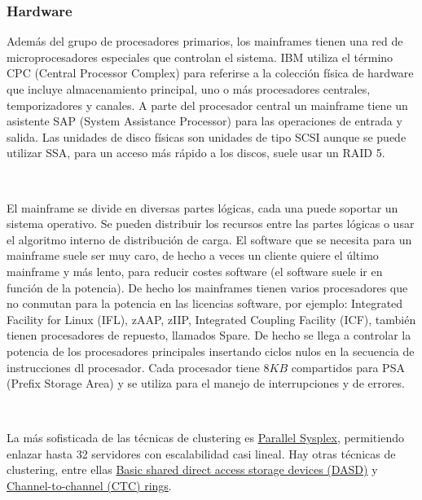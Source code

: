 \documentclass[paper=a4, fontsize=10pt]{scrartcl} %
\numberwithin{equation}{section} %
\numberwithin{figure}{section} %
\numberwithin{table}{section} %
\begin{document}
\subsubsection{Hardware}
Además del grupo de procesadores primarios, los mainframes tienen una red de microprocesadores especiales que controlan el sistema.
IBM utiliza el término CPC (Central Processor Complex) para referirse a la colección física de hardware que incluye almacenamiento principal, uno o más procesadores centrales, temporizadores y canales.
A parte del procesador central un mainframe tiene un asistente SAP (System Assistance Processor) para las operaciones de entrada y salida.
Las unidades de disco físicas son unidades de tipo SCSI aunque se puede utilizar SSA, para un acceso más rápido a los discos, suele usar un RAID 5.

\

El mainframe se divide en diversas partes lógicas, cada una puede soportar un sistema operativo.
Se pueden distribuir los recursos entre las partes lógicas o usar el algoritmo interno de distribución de carga.
El software que se necesita para un mainframe suele ser muy caro, de hecho a veces un cliente quiere el último mainframe y más lento, para reducir costes software (el software suele ir en función de la potencia).
De hecho los mainframes tienen varios procesadores que no conmutan para la potencia en las licencias software, por ejemplo: Integrated Facility for Linux (IFL), zAAP, zIIP, Integrated Coupling Facility (ICF), también tienen procesadores de repuesto, llamados Spare. 
De hecho se llega a controlar la potencia de los procesadores principales insertando ciclos nulos en la secuencia de instrucciones dl procesador.
Cada procesador tiene $8KB$ compartidos para PSA (Prefix Storage Area) y se utiliza para el manejo de interrupciones y de errores.

\

La más sofisticada de las técnicas de clustering es \href{https://www.ibm.com/support/knowledgecenter/zosbasics/com.ibm.zos.zmainframe/zconc_clusterPlSys.htm?view=embed}{Parallel Sysplex}, permitiendo enlazar hasta 32 servidores con escalabilidad casi lineal. 
Hay otras técnicas de clustering, entre ellas \href{https://www.ibm.com/support/knowledgecenter/zosbasics/com.ibm.zos.zmainframe/zconc_clusterDASD.htm?view=embed}{Basic shared direct access storage devices (DASD)} y  \href{https://www.ibm.com/support/knowledgecenter/zosbasics/com.ibm.zos.zmainframe/zconc_clusterCTC.htm?view=embed}{Channel-to-channel (CTC) rings}.
\end{document}
